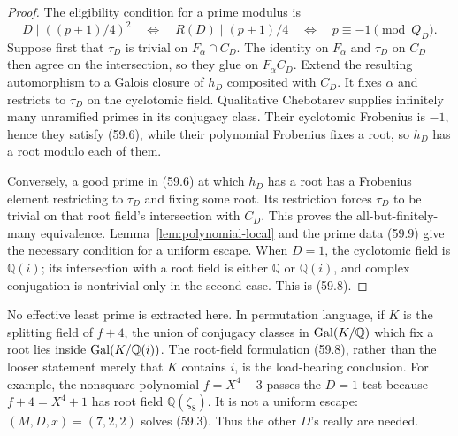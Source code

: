 \documentclass[10pt,reqno]{amsart}
\theoremstyle{definition}
\newcommand{\1}{\mathbf 1}
\begin{document}
\begin{proof}
The eligibility condition for a prime modulus is
\begin{equation}\tag{59.9}
 D\mid((p+1)/4)^2
 \quad\Longleftrightarrow\quad R(D)\mid(p+1)/4
 \quad\Longleftrightarrow\quad p\equiv-1\pmod {Q_D}.
\end{equation}
Suppose first that $\tau_D$ is trivial on $F_\alpha\cap C_D$.  The identity
on $F_\alpha$ and $\tau_D$ on $C_D$ then agree on the intersection, so they
glue on $F_\alpha C_D$.  Extend the resulting automorphism to a Galois
closure of $h_D$ composited with $C_D$.  It fixes $\alpha$ and restricts to
$\tau_D$ on the cyclotomic field.  Qualitative Chebotarev supplies
infinitely many unramified primes in its conjugacy class.  Their cyclotomic
Frobenius is $-1$, hence they satisfy (59.6), while their polynomial
Frobenius fixes a root, so $h_D$ has a root modulo each of them.

Conversely, a good prime in (59.6) at which $h_D$ has a root has a Frobenius
element restricting to $\tau_D$ and fixing some root.  Its restriction
forces $\tau_D$ to be trivial on that root field's intersection with $C_D$.
This proves the all-but-finitely-many equivalence.  Lemma~\ref{lem:polynomial-local}
and the prime data (59.9) give the necessary condition for a uniform escape.
When $D=1$, the cyclotomic field is $\mathbb Q(i)$; its intersection with a
root field is either $\mathbb Q$ or $\mathbb Q(i)$, and complex conjugation
is nontrivial only in the second case.  This is (59.8).
\end{proof}

No effective least prime is extracted here.  In permutation language, if
$K$ is the splitting field of $f+4$, the union of conjugacy classes in
${\rm Gal}(K/\mathbb Q)$ which fix a root lies inside
${\rm Gal}(K/\mathbb Q(i))$.  The root-field formulation (59.8), rather
than the looser statement merely that $K$ contains $i$, is the load-bearing
conclusion.  For example, the nonsquare polynomial $f=X^4-3$ passes the
$D=1$ test because $f+4=X^4+1$ has root field
$\mathbb Q(\zeta_8)$.  It is not a uniform escape:
$(M,D,x)=(7,2,2)$ solves (59.3).  Thus the other $D$'s really are needed.
\end{document}

